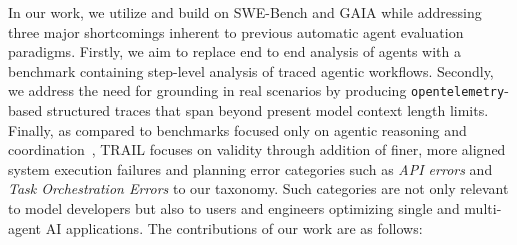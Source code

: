 In our work, we utilize and build on SWE-Bench \cite{jimenez2024swebench, aleithan2024swebenchplus} and GAIA \cite{mialon2023gaia} while addressing three major shortcomings inherent to previous automatic agent evaluation paradigms. Firstly, we aim to replace end to end analysis of agents with a benchmark containing step-level analysis of traced agentic workflows. Secondly, we address the need for grounding in real scenarios by producing \texttt{opentelemetry}-based structured traces that span beyond present model context length limits. Finally, as compared to benchmarks focused only on agentic reasoning and coordination~\cite{cemri2025multi, kokel2025acp}, \textsc{TRAIL} focuses on validity through addition of finer, more aligned system execution failures and planning error categories such as \textit{API errors} and \textit{Task Orchestration Errors} to our taxonomy. Such categories are not only relevant to model developers but also to users and engineers optimizing single and multi-agent AI applications. 
The contributions of our work are as follows:
